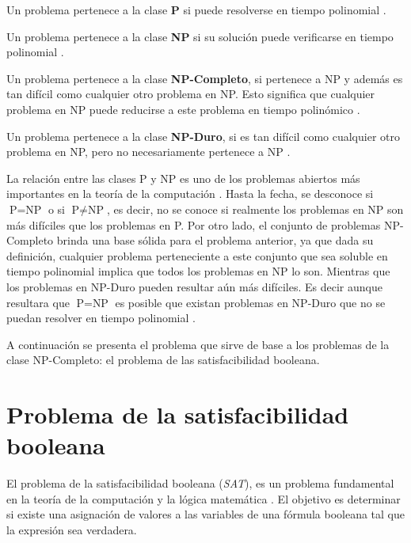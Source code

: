 \begin{definition}
  Un problema pertenece a la clase \textbf{P} si puede resolverse en tiempo polinomial \cite{authomataTheory}.
\end{definition}

\begin{definition}
  Un problema pertenece a la clase \textbf{NP} si su solución puede verificarse en tiempo polinomial \cite{authomataTheory}.
\end{definition}

\begin{definition}
  Un problema pertenece a la clase \textbf{NP-Completo}, si pertenece a NP y además es tan difícil como cualquier otro problema en NP. Esto significa que cualquier problema en NP puede reducirse a este problema en tiempo polinómico \cite{authomataTheory}.
\end{definition}

\begin{definition}
  Un problema pertenece a la clase \textbf{NP-Duro}, si es tan difícil como cualquier otro problema en NP, pero no necesariamente pertenece a NP \cite{authomataTheory}. 
\end{definition}

La relación entre las clases P y NP es uno de los problemas abiertos más importantes en la teoría de la computación \cite{authomataTheory}. Hasta la fecha, se desconoce si $\text{P} = \text{NP}$ o si $\text{P} \neq \text{NP}$, es decir, no se conoce si realmente los problemas en NP son más difíciles que los problemas en P. Por otro lado, el conjunto de problemas NP-Completo brinda una base sólida para el problema anterior, ya que dada su definición, cualquier problema perteneciente a este conjunto que sea soluble en tiempo polinomial implica que todos los problemas en NP lo son. Mientras que los problemas en NP-Duro pueden resultar aún más difíciles. Es decir aunque resultara que $\text{P} = \text{NP}$ es posible que existan problemas en NP-Duro que no se puedan resolver en tiempo polinomial \cite{authomataTheory}.

A continuación se presenta el problema que sirve de base a los problemas de la clase NP-Completo: el problema de las satisfacibilidad
booleana.

\section{Problema de la satisfacibilidad booleana}

El problema de la satisfacibilidad booleana (\textit{SAT}), es un problema fundamental en la teoría de la computación y la lógica matemática \cite{authomataTheory}. El objetivo es determinar si existe una asignación de valores a las variables de una fórmula booleana tal que la expresión sea verdadera.

